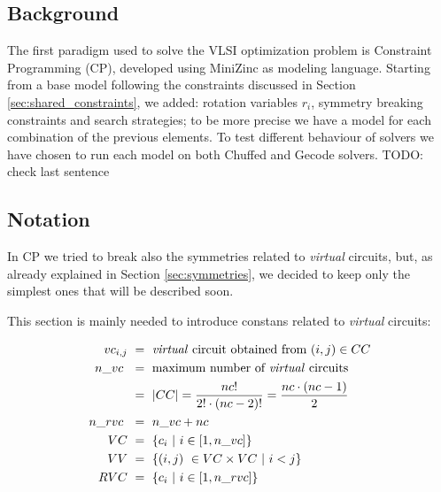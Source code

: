 
\subsection{Background}
The first paradigm used to solve the VLSI optimization problem is Constraint Programming (CP),
developed using MiniZinc as modeling language.
Starting from a base model following the constraints discussed in Section \ref{sec:shared_constraints},
we added: rotation variables $r_i$, symmetry breaking constraints and search strategies;
to be more precise we have a model for each combination of the previous elements.
To test different behaviour of solvers we have chosen to run each model on both Chuffed and Gecode solvers.
\colorbox{BurntOrange}{TODO: check last sentence}


\subsection{Notation} \label{sec:CP_notation}
In CP we tried to break also the symmetries related to \textit{virtual} circuits, but, as already
explained in Section \ref{sec:symmetries}, we decided to keep only the simplest ones that will
be described soon.

This section is mainly needed to introduce constans related to \textit{virtual} circuits:

\begin{align*}
  vc_{i,j} & \ =\ \text{\textit{virtual} circuit obtained from  } (i,j) \in CC      \\
  n\_vc\   & \ =\ \text{maximum number of \textit{virtual} circuits}                \\
           & \ =\ |CC| = \frac{nc!}{2! \cdot (nc - 2)!} = \frac{nc \cdot (nc-1)}{2} \\
  n\_rvc\  & \ =\ n\_vc + nc                                                        \\
  VC       & \ =\ \{ c_i\ |\ i \in [1,n\_vc] \}                                     \\
  VV       & \ =\ \{ (i,j)\ \in VC \times VC\ |\ i <j \}                             \\
  RVC      & \ =\ \{ c_i\ |\ i \in [1,n\_rvc] \}                                    \\
\end{align*}

